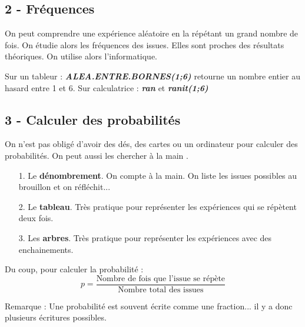 \documentclass[12pt]{article}
\begin{document}
\subsection*{2 - Fréquences}

On peut comprendre une expérience aléatoire en la répétant un grand nombre de fois. On étudie alors les fréquences des issues. Elles sont proches des résultats théoriques. On utilise alors l'informatique.

Sur un tableur : \textit{\textbf{ALEA.ENTRE.BORNES(1;6)}} retourne un nombre entier au hasard entre 1 et 6.
Sur calculatrice : \textit{\textbf{ran}} et \textit{\textbf{ranit(1;6)}}


\subsection*{3 - Calculer des probabilités}

On n'est pas obligé d'avoir des dés, des cartes ou un ordinateur pour calculer des probabilités. On peut aussi les chercher \og à la main \fg . 

\begin{enumerate}
\item[1.] Le \textbf{dénombrement}. On compte à la main. On liste les issues possibles au brouillon et on réfléchit...
\item[2.] Le \textbf{tableau}. Très pratique pour représenter les expériences qui se répètent deux fois.
\item[3.] Les \textbf{arbres}. Très pratique pour représenter les expériences avec des enchainements.
\end{enumerate}

Du coup, pour calculer la probabilité :
$$p = \dfrac{\text{Nombre de fois que l'issue se répète}}{\text{Nombre total des issues}}$$

Remarque : Une probabilité est souvent écrite comme une fraction... il y a donc plusieurs écritures possibles.
\end{document}
